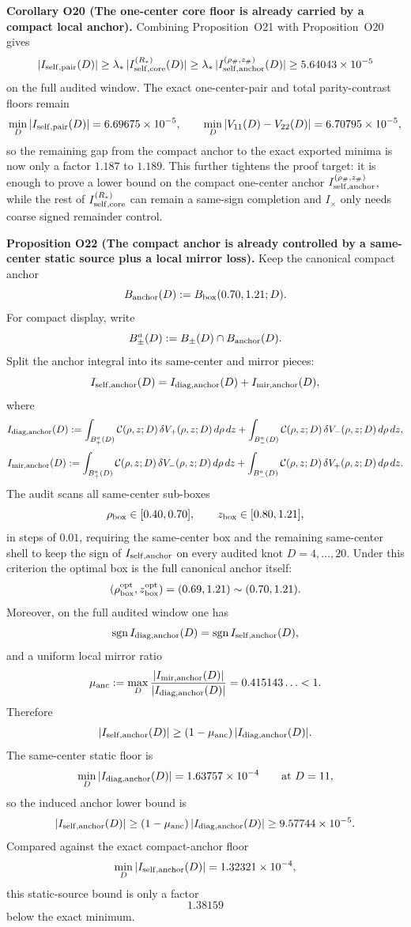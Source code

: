 \documentclass[aps,prd,onecolumn,notitlepage,nofootinbib,superscriptaddress,11pt,floatfix]{revtex4-2}
\begin{document}
\medskip\noindent\textbf{Corollary O20 (The one-center core floor is already carried by a compact local anchor).}
Combining Proposition~O21 with Proposition~O20 gives
\[
|I_{\rm self,pair}(D)|
\ge
\lambda_\ast\,|I_{\rm self,core}^{(R_\ast)}(D)|
\ge
\lambda_\ast\,|I_{\rm self,anchor}^{(\rho_\#,z_\#)}(D)|
\ge
5.64043\times10^{-5}
\]
on the full audited window. The exact one-center-pair and total parity-contrast floors remain
\[
\min_D |I_{\rm self,pair}(D)|=6.69675\times10^{-5},
\qquad
\min_D |V_{11}(D)-V_{22}(D)|=6.70795\times10^{-5},
\]
so the remaining gap from the compact anchor to the exact exported minima is now only a factor \(1.187\) to \(1.189\).  This further tightens the proof target: it is enough to prove a lower bound on the compact one-center anchor \(I_{\rm self,anchor}^{(\rho_\#,z_\#)}\), while the rest of \(I_{\rm self,core}^{(R_\ast)}\) can remain a same-sign completion and \(I_\times\) only needs coarse signed remainder control.

\medskip\noindent\textbf{Proposition O22 (The compact anchor is already controlled by a same-center static source plus a local mirror loss).}
Keep the canonical compact anchor
\[
B_{\rm anchor}(D):=B_{\rm box}(0.70,1.21;D).
\]
For compact display, write
\[
B_\pm^a(D):=B_\pm(D)\cap B_{\rm anchor}(D).
\]
Split the anchor integral into its same-center and mirror pieces:
\[
I_{\rm self,anchor}(D)=I_{\rm diag,anchor}(D)+I_{\rm mir,anchor}(D),
\]
where
\[
I_{\rm diag,anchor}(D)
:=
\int_{B_+^a(D)}
\mathcal C(\rho,z;D)\,\delta V_+(\rho,z;D)\,d\rho\,dz
+
\int_{B_-^a(D)}
\mathcal C(\rho,z;D)\,\delta V_-(\rho,z;D)\,d\rho\,dz,
\]
\[
I_{\rm mir,anchor}(D)
:=
\int_{B_+^a(D)}
\mathcal C(\rho,z;D)\,\delta V_-(\rho,z;D)\,d\rho\,dz
+
\int_{B_-^a(D)}
\mathcal C(\rho,z;D)\,\delta V_+(\rho,z;D)\,d\rho\,dz.
\]
The audit  scans all same-center sub-boxes
\[
\rho_{\rm box}\in[0.40,0.70],\qquad
z_{\rm box}\in[0.80,1.21],
\]
in steps of \(0.01\), requiring the same-center box and the remaining same-center shell to keep the sign of \(I_{\rm self,anchor}\) on every audited knot \(D=4,\dots,20\).  Under this criterion the optimal box is the full canonical anchor itself:
\[
(\rho_{\rm box}^{\rm opt},z_{\rm box}^{\rm opt})=(0.69,1.21)\sim(0.70,1.21).
\]
Moreover, on the full audited window one has
\[
\operatorname{sgn} I_{\rm diag,anchor}(D)
=
\operatorname{sgn} I_{\rm self,anchor}(D),
\]
and a uniform local mirror ratio
\[
\mu_{\rm anc}
:=
\max_D \frac{|I_{\rm mir,anchor}(D)|}{|I_{\rm diag,anchor}(D)|}
=
0.415143\ldots<1.
\]
Therefore
\[
|I_{\rm self,anchor}(D)|
\ge
(1-\mu_{\rm anc})\,|I_{\rm diag,anchor}(D)|.
\]
The same-center static floor is
\[
\min_D |I_{\rm diag,anchor}(D)|=1.63757\times10^{-4}
\qquad\text{at }D=11,
\]
so the induced anchor lower bound is
\[
|I_{\rm self,anchor}(D)|
\ge
(1-\mu_{\rm anc})\,|I_{\rm diag,anchor}(D)|
\ge
9.57744\times10^{-5}.
\]
Compared against the exact compact-anchor floor
\[
\min_D |I_{\rm self,anchor}(D)|=1.32321\times10^{-4},
\]
this static-source bound is only a factor
\[
1.38159
\]
below the exact minimum.
\end{document}
